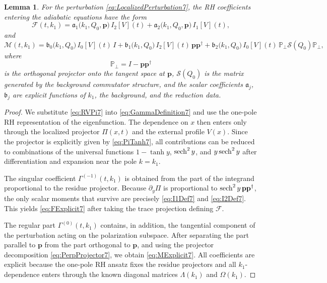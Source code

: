\documentclass[11pt]{amsart}
\newcommand{\sech}{\mathop{\rm sech}\nolimits}
\newtheorem{lemma}{Lemma}[section]
\theoremstyle{definition}
\numberwithin{equation}{section}
\begin{document}
\begin{lemma}
For the perturbation \eqref{eq:LocalizedPerturbation7}, the RH coefficients entering the adiabatic equations have the form
\begin{equation}
\mathcal{F}(t,k_1)
=
\mathfrak{a}_1\bigl(k_1,Q_0,\mathbf{p}\bigr)\,I_2[V](t)
+
\mathfrak{a}_2\bigl(k_1,Q_0,\mathbf{p}\bigr)\,I_1[V](t),
\label{eq:FExplicit7}
\end{equation}
and
\begin{equation}
\mathcal{M}(t,k_1)
=
\mathfrak{b}_0\bigl(k_1,Q_0\bigr)\,I_0[V](t)\,I
+
\mathfrak{b}_1\bigl(k_1,Q_0\bigr)\,I_2[V](t)\,\mathbf{p}\mathbf{p}^\dagger
+
\mathfrak{b}_2\bigl(k_1,Q_0\bigr)\,I_0[V](t)\,\mathbb{P}_\perp \mathcal{S}(Q_0)\mathbb{P}_\perp,
\label{eq:MExplicit7}
\end{equation}
where
\begin{equation}
\mathbb{P}_\perp = I-\mathbf{p}\mathbf{p}^\dagger
\label{eq:PerpProjector7}
\end{equation}
is the orthogonal projector onto the tangent space at $\mathbf{p}$, $\mathcal{S}(Q_0)$ is the matrix generated by the background commutator structure, and the scalar coefficients $\mathfrak{a}_j$, $\mathfrak{b}_j$ are explicit functions of $k_1$, the background, and the reduction data.
\end{lemma}

\begin{proof}
We substitute \eqref{eq:RVPi7} into \eqref{eq:GammaDefinition7} and use the one-pole RH representation of the eigenfunction. The dependence on $x$ then enters only through the localized projector $\Pi(x,t)$ and the external profile $V(x)$. Since the projector is explicitly given by \eqref{eq:PiTanh7}, all contributions can be reduced to combinations of the universal functions $1-\tanh y$, $\sech^2 y$, and $y\sech^2 y$ after differentiation and expansion near the pole $k=k_1$.

The singular coefficient $\Gamma^{(-1)}(t,k_1)$ is obtained from the part of the integrand proportional to the residue projector. Because $\partial_y \Pi$ is proportional to $\sech^2 y\,\mathbf{p}\mathbf{p}^\dagger$, the only scalar moments that survive are precisely \eqref{eq:I1Def7} and \eqref{eq:I2Def7}. This yields \eqref{eq:FExplicit7} after taking the trace projection defining $\mathcal{F}$.

The regular part $\Gamma^{(0)}(t,k_1)$ contains, in addition, the tangential component of the perturbation acting on the polarization subspace. After separating the part parallel to $\mathbf p$ from the part orthogonal to $\mathbf p$, and using the projector decomposition \eqref{eq:PerpProjector7}, we obtain \eqref{eq:MExplicit7}. All coefficients are explicit because the one-pole RH ansatz fixes the residue projectors and all $k_1$-dependence enters through the known diagonal matrices $\Lambda(k_1)$ and $\Omega(k_1)$.
\end{proof}
\end{document}
